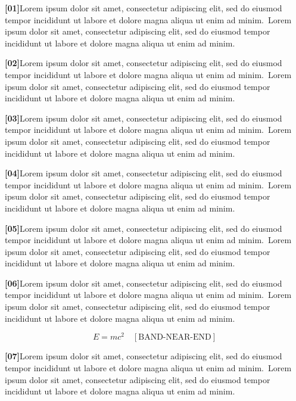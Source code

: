 \documentclass[twocolumn]{article}
\newcommand\Body{Lorem ipsum dolor sit amet, consectetur adipiscing elit, sed do
eiusmod tempor incididunt ut labore et dolore magna aliqua ut enim ad minim.}
\newcommand\Par[1]{\par\noindent\textbf{[#1]}\space\Body\ \Body\par\medskip}
\begin{document}
\Par{01}\Par{02}\Par{03}\Par{04}\Par{05}\Par{06}
\begin{wideband}\[ E=mc^2 \quad[\text{BAND-NEAR-END}] \]\end{wideband}
\Par{07}
\end{document}
